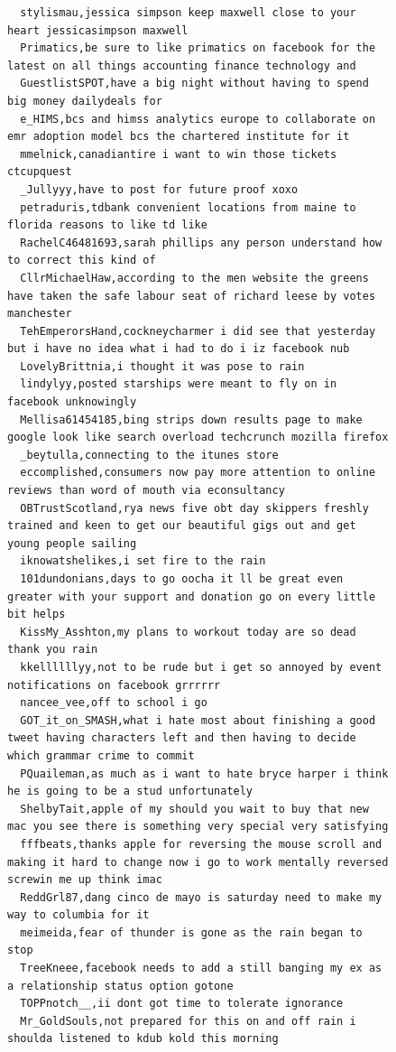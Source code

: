 \begin{figure}[htpb]
\begin{verbatim}
  stylismau,jessica simpson keep maxwell close to your heart jessicasimpson maxwell
  Primatics,be sure to like primatics on facebook for the latest on all things accounting finance technology and
  GuestlistSPOT,have a big night without having to spend big money dailydeals for
  e_HIMS,bcs and himss analytics europe to collaborate on emr adoption model bcs the chartered institute for it
  mmelnick,canadiantire i want to win those tickets ctcupquest
  _Jullyyy,have to post for future proof xoxo
  petraduris,tdbank convenient locations from maine to florida reasons to like td like
  RachelC46481693,sarah phillips any person understand how to correct this kind of
  CllrMichaelHaw,according to the men website the greens have taken the safe labour seat of richard leese by votes manchester
  TehEmperorsHand,cockneycharmer i did see that yesterday but i have no idea what i had to do i iz facebook nub
  LovelyBrittnia,i thought it was pose to rain
  lindylyy,posted starships were meant to fly on in facebook unknowingly
  Mellisa61454185,bing strips down results page to make google look like search overload techcrunch mozilla firefox
  _beytulla,connecting to the itunes store
  eccomplished,consumers now pay more attention to online reviews than word of mouth via econsultancy
  OBTrustScotland,rya news five obt day skippers freshly trained and keen to get our beautiful gigs out and get young people sailing
  iknowatshelikes,i set fire to the rain
  101dundonians,days to go oocha it ll be great even greater with your support and donation go on every little bit helps
  KissMy_Asshton,my plans to workout today are so dead thank you rain
  kkellllllyy,not to be rude but i get so annoyed by event notifications on facebook grrrrrr
  nancee_vee,off to school i go
  GOT_it_on_SMASH,what i hate most about finishing a good tweet having characters left and then having to decide which grammar crime to commit
  PQuaileman,as much as i want to hate bryce harper i think he is going to be a stud unfortunately
  ShelbyTait,apple of my should you wait to buy that new mac you see there is something very special very satisfying
  fffbeats,thanks apple for reversing the mouse scroll and making it hard to change now i go to work mentally reversed screwin me up think imac
  ReddGrl87,dang cinco de mayo is saturday need to make my way to columbia for it
  meimeida,fear of thunder is gone as the rain began to stop
  TreeKneee,facebook needs to add a still banging my ex as a relationship status option gotone
  TOPPnotch__,ii dont got time to tolerate ignorance
  Mr_GoldSouls,not prepared for this on and off rain i shoulda listened to kdub kold this morning

\end{verbatim}
\end{figure}
